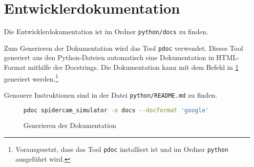 \section{Entwicklerdokumentation}
\label{sec:entwicklerdokumentation}

Die Entwicklerdokumentation ist im Ordner \texttt{python/docs} zu finden.

Zum Generieren der Dokumentation wird das Tool \texttt{pdoc} verwendet.
Dieses Tool generiert aus den Python-Dateien automatisch eine Dokumentation in HTML-Format mithilfe der Docstrings.
Die Dokumentation kann mit dem Befehl in \ref{lst:generate_documentation} generiert werden.\footnote{Vorausgesetzt, dass das Tool \texttt{pdoc} installiert ist und im Ordner \texttt{python} ausgeführt wird.}

Genauere Instruktionen sind in der Datei \texttt{python/README.md} zu finden.

\begin{figure}[H]
    \centering
    \begin{lstlisting}[language=bash] 
        pdoc spidercam_simulator -o docs --docformat 'google'
    \end{lstlisting}
    \caption{Generieren der Dokumentation}
    \label{lst:generate_documentation}
\end{figure}